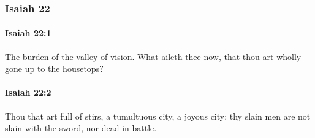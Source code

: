 	\subsubsection{Isaiah 22} %
		\label{ISAIAH-22}

		\paragraph{Isaiah 22:1} %
			\label{ISAIAH-22-1}

			The burden of the valley of vision. What aileth thee now, that thou art wholly gone up to the housetops?


		\paragraph{Isaiah 22:2} %
			\label{ISAIAH-22-2}

			Thou that art full of stirs, a tumultuous city, a joyous city: thy slain men are not slain with the sword, nor dead in battle.

